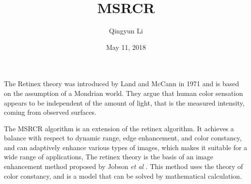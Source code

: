 \documentclass{article}
\author{Qingyun Li}
\date{May 11, 2018}
\title{MSRCR}
\begin{document}
\maketitle
 \par The Retinex theory was introduced by Land and McCann in 1971 and is based on the assumption of a Mondrian world. They argue that human color sensation appears to be independent of the amount of light, that is the measured intensity, coming from observed surfaces. 
 \par The MSRCR algorithm is an extension of the retinex algorithm\cite{Rahman1996Multiscale}. It achieves a balance with respect to dynamic range, edge enhancement, and color constancy, and can adaptively enhance various types of images, which makes it suitable for a wide range of applications, The retinex theory is the basis of an image enhancement method proposed by Jobson \emph {et al} \cite{Lim2014Image}. This method uses the theory of color constancy, and is a model that can be solved by mathematical calculation.


\end{document}
